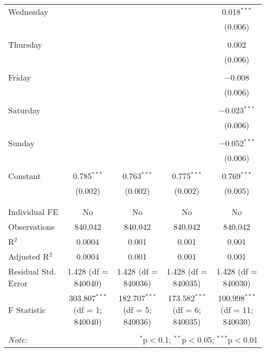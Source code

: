 \documentclass[
]{article}
\begin{document}
\begin{table}[!htbp]
{\begin{tabular}{@{\extracolsep{5pt}}lcccc}
 Wednesday &  &  &  & 0.018$^{***}$ \\ 
  &  &  &  & (0.006) \\ 
  & & & & \\ 
 Thursday &  &  &  & 0.002 \\ 
  &  &  &  & (0.006) \\ 
  & & & & \\ 
 Friday &  &  &  & $-$0.008 \\ 
  &  &  &  & (0.006) \\ 
  & & & & \\ 
 Saturday &  &  &  & $-$0.023$^{***}$ \\ 
  &  &  &  & (0.006) \\ 
  & & & & \\ 
 Sunday &  &  &  & $-$0.052$^{***}$ \\ 
  &  &  &  & (0.006) \\ 
  & & & & \\ 
 Constant & 0.785$^{***}$ & 0.763$^{***}$ & 0.775$^{***}$ & 0.769$^{***}$ \\ 
  & (0.002) & (0.002) & (0.002) & (0.005) \\ 
  & & & & \\ 
\hline \\[-1.8ex] 
Individual FE & No & No & No & No \\ 
Observations & 840,042 & 840,042 & 840,042 & 840,042 \\ 
R$^{2}$ & 0.0004 & 0.001 & 0.001 & 0.001 \\ 
Adjusted R$^{2}$ & 0.0004 & 0.001 & 0.001 & 0.001 \\ 
Residual Std. Error & 1.428 (df = 840040) & 1.428 (df = 840036) & 1.428 (df = 840035) & 1.428 (df = 840030) \\ 
F Statistic & 303.807$^{***}$ (df = 1; 840040) & 182.707$^{***}$ (df = 5; 840036) & 173.582$^{***}$ (df = 6; 840035) & 100.998$^{***}$ (df = 11; 840030) \\ 
\hline 
\hline \\[-1.8ex] 
\textit{Note:}  & \multicolumn{4}{r}{$^{*}$p$<$0.1; $^{**}$p$<$0.05; $^{***}$p$<$0.01} \\ 
\end{tabular}
} 
\end{table} 
\newpage
\end{document}
